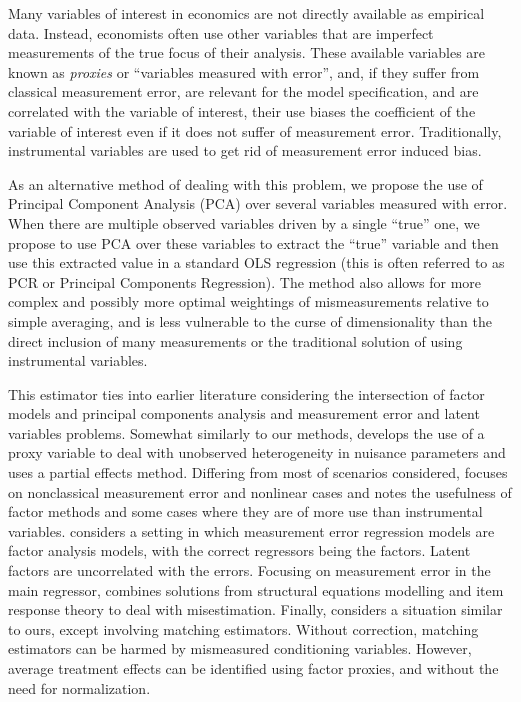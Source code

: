 \documentclass[10pt]{article}
\begin{document}
        Many variables of interest in economics are not directly available as empirical data. Instead, economists often use other variables that are imperfect measurements of the true focus of their analysis. These available variables are known as \textit{proxies} or ``variables measured with error'', and, if they suffer from classical measurement error, are relevant for the model specification, and are correlated with the variable of interest, their use biases the coefficient of the variable of interest even if it does not suffer of measurement error. Traditionally, instrumental variables are used to get rid of measurement error induced bias.

        As an alternative method of dealing with this problem, we propose the use of Principal Component Analysis (PCA) over several variables measured with error. When there are multiple observed variables driven by a single ``true'' one, we propose to use PCA over these variables to extract the ``true'' variable and then use this extracted value in a standard OLS regression (this is often referred to as PCR or Principal Components Regression). The method also allows for more complex and possibly more optimal weightings of mismeasurements relative to simple averaging, and is less vulnerable to the curse of dimensionality than the direct inclusion of many measurements or the traditional solution of using instrumental variables.

        This estimator ties into earlier literature considering the intersection of factor models and principal components analysis and measurement error and latent variables problems. Somewhat similarly to our methods, \cite{nagasawa_identication_2020} develops the use of a proxy variable to deal with unobserved heterogeneity in nuisance parameters and uses a partial effects method. Differing from most of scenarios considered, \cite{schennach_recent_2016} focuses on nonclassical measurement error and nonlinear cases and notes the usefulness of factor methods and some cases where they are of more use than instrumental variables. \cite{wegge_local_1996} considers a setting in which measurement error regression models are factor analysis models, with the correct regressors being the factors. Latent factors are uncorrelated with the errors. Focusing on measurement error in the main regressor, \cite{schofield_correcting_2015} combines solutions from structural equations modelling and item response theory to deal with misestimation. Finally, \cite{heckman_matching_2010} considers a situation similar to ours, except involving matching estimators. Without correction, matching estimators can be harmed by mismeasured conditioning variables. However, average treatment effects can be identified using factor proxies, and without the need for normalization.
\end{document}
